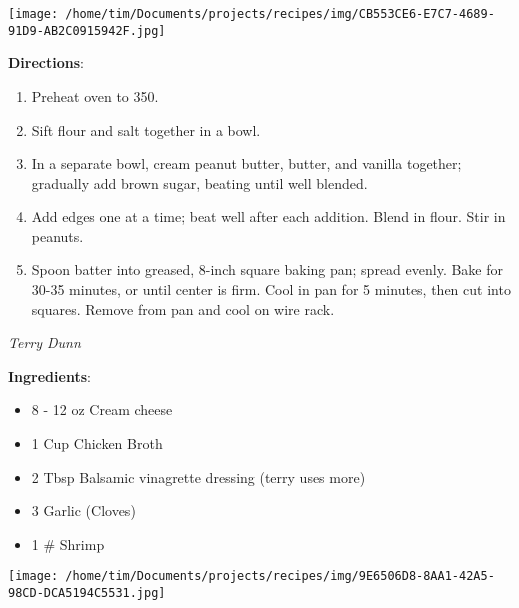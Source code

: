 \documentclass[11pt, twoside, openany]{book}
\begin{document}
\begin{minipage}[t]{0.2\linewidth}
\centering \strut\vspace*{-\baselineskip}\newline
\texttt{[image: /home/tim/Documents/projects/recipes/img/CB553CE6-E7C7-4689-91D9-AB2C0915942F.jpg]}\\
\end{minipage}\vspace{3mm}
\textbf{Directions}:
\vspace{-3mm}\begin{enumerate}\setlength\itemsep{-1mm}
\item Preheat oven to 350.
\item Sift flour and salt together in a bowl.
\item In a separate bowl, cream peanut butter, butter, and vanilla together; gradually add brown sugar, beating until well blended.
\item Add edges one at a time; beat well after each addition. Blend in flour. Stir in peanuts.
\item Spoon batter into greased, 8-inch square baking pan; spread evenly. Bake for 30-35 minutes, or until center is firm. Cool in pan for 5 minutes, then cut into squares. Remove from pan and cool on wire rack.
\end{enumerate}
 \label{shrimp-alfredo}\hfill\textit{Terry Dunn}\\
\begin{minipage}[t]{0.8\linewidth}
\textbf{Ingredients}:\vspace{-3mm}
\begin{multicols}{2}
\begin{itemize}\setlength\itemsep{-1mm}
\item 8 - 12 oz Cream cheese
\item 1 Cup Chicken Broth
\item 2 Tbsp Balsamic vinagrette dressing (terry uses more)
\item 3 Garlic (Cloves)
\item 1 # Shrimp
\end{itemize}
\end{multicols}
\end{minipage}
\begin{minipage}[t]{0.2\linewidth}
\centering \strut\vspace*{-\baselineskip}\newline
\texttt{[image: /home/tim/Documents/projects/recipes/img/9E6506D8-8AA1-42A5-98CD-DCA5194C5531.jpg]}\\
\end{minipage}\vspace{3mm}
\end{document}
